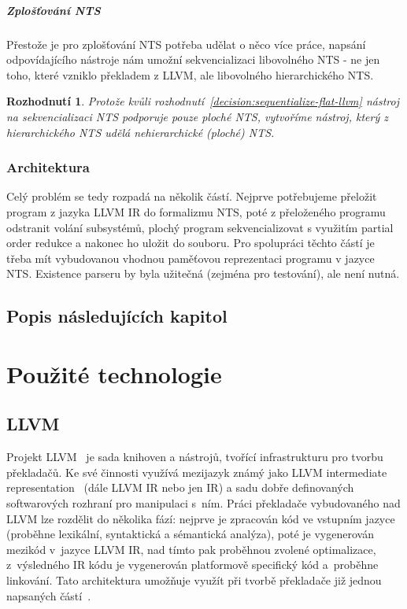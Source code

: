 \documentclass{fithesis2}
\newtheorem{decision}  {Rozhodnutí}
\begin{document}
\paragraph{Zplošťování NTS}
Přestože je pro zplošťování NTS potřeba udělat o něco více práce, napsání odpovídajícího nástroje nám umožní sekvencializaci libovolného NTS - ne jen toho, které vzniklo překladem z LLVM, ale libovolného hierarchického NTS.

\begin{decision}\label{decision:do-nts-flattening}
Protože kvůli rozhodnutí~\ref{decision:sequentialize-flat-llvm} nástroj na sekvencializaci NTS podporuje pouze ploché NTS, vytvoříme nástroj, který z hierarchického NTS udělá nehierarchické (ploché) NTS.
\end{decision}

\subsection{Architektura}
Celý problém se tedy rozpadá na několik částí. Nejprve potřebujeme přeložit program z jazyka LLVM IR do formalizmu NTS, poté z přeloženého programu odstranit volání subsystémů, plochý program sekvencializovat s využitím partial order redukce a nakonec ho uložit do souboru. Pro spolupráci těchto částí je třeba mít vybudovanou vhodnou paměťovou reprezentaci programu v jazyce NTS. Existence parseru by byla užitečná (zejména pro testování), ale není nutná.

\section{Popis následujících kapitol}



\chapter{Použité technologie}
\section{LLVM}
Projekt LLVM~\cite{LLVM} je sada knihoven a nástrojů, tvořící infrastrukturu pro tvorbu překladačů. Ke své činnosti využívá mezijazyk známý jako LLVM intermediate representation~\cite{LLVM-langRef} (dále LLVM IR nebo jen IR) a sadu dobře definovaných softwarových rozhraní pro manipulaci s~ním. Práci překladače vybudovaného nad LLVM lze rozdělit do několika fází: nejprve je zpracován kód ve vstupním jazyce (proběhne lexikální, syntaktická a sémantická analýza), poté je vygenerován mezikód v~jazyce LLVM IR, nad tímto pak proběhnou zvolené optimalizace, z~výsledného IR kódu je vygenerován platformově specifický kód a~proběhne linkování. Tato architektura umožňuje využít při tvorbě překladače již jednou napsaných částí~\cite{AOSABOOK-LLVM}.
\end{document}
